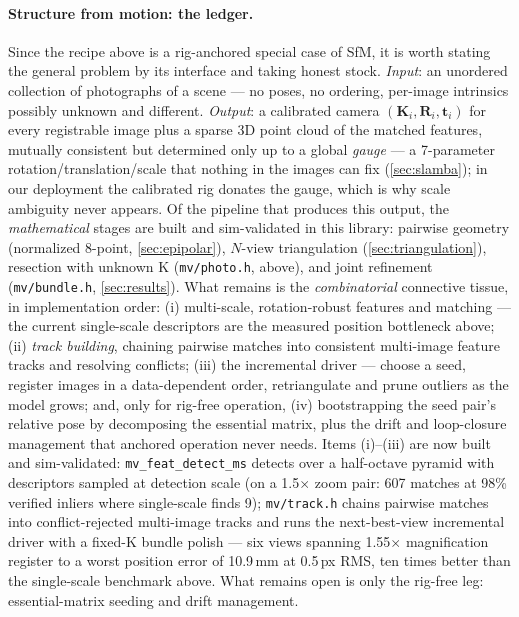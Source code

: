 \documentclass[11pt]{article}
\theoremstyle{definition}
\newcommand{\mat}[1]{\mathbf{#1}}
\newcommand{\vect}[1]{\mathbf{#1}}
\newcommand{\R}{\mat{R}}
\newcommand{\K}{\mat{K}}
\newcommand{\tv}{\vect{t}}
\newcommand{\code}[1]{\texttt{#1}}
\begin{document}
\paragraph{Structure from motion: the ledger.} Since the recipe above
is a rig-anchored special case of SfM, it is worth stating the general
problem by its interface and taking honest stock. \emph{Input}: an
unordered collection of photographs of a scene --- no poses, no
ordering, per-image intrinsics possibly unknown and different.
\emph{Output}: a calibrated camera $(\K_i,\R_i,\tv_i)$ for every
registrable image plus a sparse 3D point cloud of the matched
features, mutually consistent but determined only up to a global
\emph{gauge} --- a 7-parameter rotation/translation/scale that nothing
in the images can fix (\autoref{sec:slamba}); in our deployment the
calibrated rig donates the gauge, which is why scale ambiguity never
appears. Of the pipeline that produces this output, the
\emph{mathematical} stages are built and sim-validated in this
library: pairwise geometry (normalized 8-point,
\autoref{sec:epipolar}), $N$-view triangulation
(\autoref{sec:triangulation}), resection with unknown K
(\code{mv/photo.h}, above), and joint refinement
(\code{mv/bundle.h}, \autoref{sec:results}). What remains is the
\emph{combinatorial} connective tissue, in implementation order:
(i) multi-scale, rotation-robust features and matching --- the current
single-scale descriptors are the measured position bottleneck above;
(ii) \emph{track building}, chaining pairwise matches into consistent
multi-image feature tracks and resolving conflicts; (iii) the
incremental driver --- choose a seed, register images in a
data-dependent order, retriangulate and prune outliers as the model
grows; and, only for rig-free operation, (iv) bootstrapping the seed
pair's relative pose by decomposing the essential matrix, plus the
drift and loop-closure management that anchored operation never
needs. Items (i)--(iii) are now built and sim-validated:
\code{mv\_feat\_detect\_ms} detects over a half-octave pyramid with
descriptors sampled at detection scale (on a 1.5\(\times\) zoom pair:
607 matches at 98\% verified inliers where single-scale finds 9);
\code{mv/track.h} chains pairwise matches into conflict-rejected
multi-image tracks and runs the next-best-view incremental driver with
a fixed-K bundle polish --- six views spanning 1.55\(\times\)
magnification register to a worst position error of 10.9\,mm at
0.5\,px RMS, ten times better than the single-scale benchmark above.
What remains open is only the rig-free leg: essential-matrix seeding
and drift management.
\end{document}
